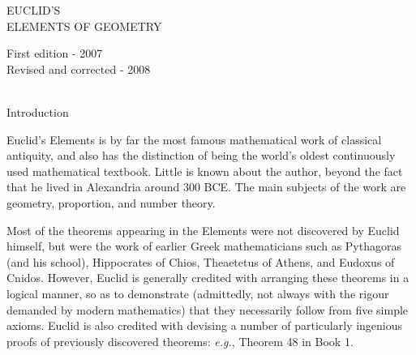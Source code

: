 \pagestyle{empty}

\thispagestyle{empty}
\begin{center}
{\Huge\sf EUCLID'S \\ \spa ELEMENTS OF GEOMETRY}\\
\mbox{}\spa\spa{}
\end{center}
\afterpage{\null\newpage}

\newpage
\thispagestyle{empty}
\begin{flushleft}
First edition - 2007\\
Revised and corrected - 2008\\
~\\
\end{flushleft}

\thispagestyle{empty}
\cleardoublepage
\thispagestyle{empty}

\newpage
\tableofcontents
\newpage
\thispagestyle{empty}
\cleardoublepage
\lhead{~} \rhead{~} \chead{~}

\newpage
{}
\pagestyle{fancy}
\cfoot{\gr{\thepage}}
\lhead{~} \rhead{~} \chead{~}
\begin{center}
{\Large Introduction}
\end{center}

Euclid's Elements is by far the most famous mathematical work of classical antiquity, and also has the distinction of being the world's oldest continuously used mathematical textbook. Little is known about the author, beyond the fact that he lived in Alexandria around 300 BCE. The main subjects  of the work 
are geometry, proportion, and number theory. 

Most of the theorems appearing in the Elements were not discovered by Euclid himself, but were the work of earlier Greek mathematicians such as Pythagoras (and his school), Hippocrates of Chios, Theaetetus of Athens, and Eudoxus of Cnidos. However, Euclid is generally credited with arranging these theorems in a logical manner, so as to demonstrate (admittedly, not always with the rigour demanded by modern mathematics) that they necessarily follow from five simple axioms. Euclid is also credited with devising a number of particularly ingenious proofs of previously discovered theorems: {\em e.g.}, Theorem 48 in Book 1.

